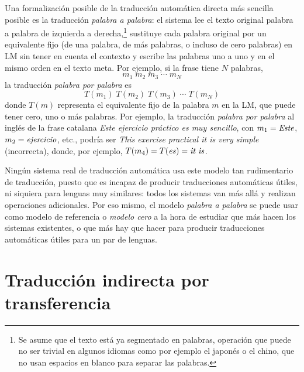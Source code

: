\label{pg:mpm} Una formalización posible de la traducción automática directa más sencilla posible es la traducción \emph{palabra a palabra}: el sistema lee el texto original palabra a palabra de izquierda a derecha,\footnote{Se asume que el texto está ya segmentado en palabras, operación que puede no ser trivial en algunos idiomas como por ejemplo el japonés o el chino, que no usan espacios en blanco para separar las palabras.} sustituye cada palabra original por un equivalente fijo (de una palabra, de más palabras, o incluso de cero palabras) en LM sin tener en cuenta el contexto y escribe las palabras uno a uno y en el mismo orden en el texto meta. Por ejemplo, si la frase tiene \(N\) palabras, \begin{displaymath} m_1\; m_2\; m_3\; \cdots \;m_N \end{displaymath} la traducción \emph{palabra por palabra} es \begin{displaymath} T(m_1)\; T(m_2)\; T(m_3)\; \cdots\; T(m_N) \end{displaymath} donde \(T(m)\) representa el equivalente fijo de la palabra \(m\) en la LM, que puede tener cero, uno o más palabras. Por ejemplo, la traducción \emph{palabra por palabra} al inglés de la frase catalana \emph{Este ejercicio práctico es muy sencillo}, con \(m_1=\mbox{\emph{Este}}\), \(m_2=\mbox{\emph{ejercicio}}\), etc., podría ser \emph{This exercise practical it is very simple} (incorrecta), donde, por ejemplo, \(T(m_4)=T(\mbox{\emph{es}})=\mbox{\emph{it is}}\). 

Ningún sistema real de traducción automática usa este modelo tan rudimentario de traducción, puesto que es incapaz de producir traducciones automáticas útiles, ni siquiera para lenguas muy similares: todos los sistemas van más allá y realizan operaciones adicionales. Por eso mismo, el modelo \emph{palabra a palabra} se puede usar como modelo de referencia o \emph{modelo cero} a la hora de estudiar que más hacen los sistemas existentes, o que más hay que hacer para producir traducciones automáticas útiles para un par de lenguas. 

\section{Traducción indirecta por transferencia} \label{ss:classtrans} 

